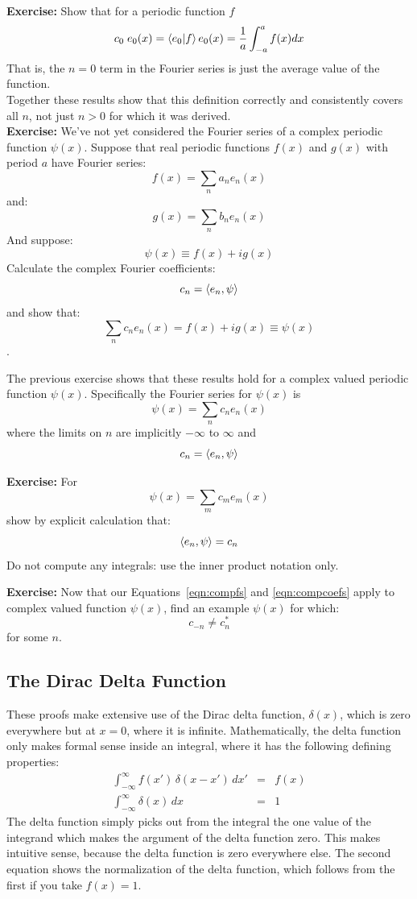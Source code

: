 \documentclass[12pt]{book}
\begin{document}
\noindent
{\bf Exercise:} Show that for a periodic function $f$ 
$$c_0 \; e_0(x) = \braket{e_0|f} e_0(x) = \frac{1}{a}\int_{-a}^{a} f(x) dx$$
\noindent
That is, the $n=0$ term in the Fourier series is just the average value of the function.\\

Together these results show that this definition correctly and consistently covers all $n$, not just $n>0$ for which it was derived.\\

\noindent
{\bf Exercise:}  We've not yet considered the Fourier series of a complex periodic function $\psi(x)$.  
Suppose that real periodic functions $f(x)$ and $g(x)$ with period $a$ have Fourier series:
$$f(x) = \sum_n a_n e_n(x)$$
and:
$$g(x) = \sum_n b_n e_n(x)$$
And suppose:
$$\psi(x) \equiv f(x) + i g(x)$$
Calculate the complex Fourier coefficients:
$$c_n = \braket{e_n, \psi}$$
and show that:
$$\sum_n c_n e_n(x) = f(x) + i g(x) \equiv \psi(x)$$.

The previous exercise shows that these results hold for a complex valued periodic function $\psi(x)$.  Specifically the 
Fourier series for $\psi(x)$ is
\begin{equation}
\label{eqn:compfs}
\psi(x) = \sum_n c_n e_n(x)
\end{equation}
where the limits on $n$ are implicitly $-\infty$ to $\infty$ and
\begin{equation}
\label{eqn:compcoefs}
c_n = \braket{e_n, \psi}
\end{equation}

\noindent
{\bf Exercise:} For 
$$\psi(x) = \sum_m c_m e_m(x)$$
show by explicit calculation that:
$$\braket{e_n, \psi} = c_n$$
Do not compute any integrals: use the inner product notation only.

\noindent
{\bf Exercise:} Now that our Equations~\ref{eqn:compfs} and \ref{eqn:compcoefs} apply to complex valued function $\psi(x)$, find an example $\psi(x)$ for which:
 $$c_{-n} \neq c_{n}^*$$
for some $n$. 

\subsection{The Dirac Delta Function}

These proofs make extensive use of the Dirac delta function, $\delta(x)$, which is zero everywhere but at $x=0$, where it is infinite.  Mathematically, the delta function only makes formal sense inside an integral, where it has the following defining properties:
\begin{eqnarray}
\int_{-\infty}^{\infty} f(x') \, \delta(x-x') \, dx' &=& f(x) \\
\int_{-\infty}^{\infty} \delta(x) \, dx &=& 1 \label{eqn:norm}
 \end{eqnarray}
The delta function simply picks out from the integral the one value of the integrand which makes the argument of the delta function zero.  This makes intuitive sense, because the delta function is zero everywhere else.  The second equation shows the normalization of the delta function, which follows from the first if you take $f(x)=1$.
\end{document}
